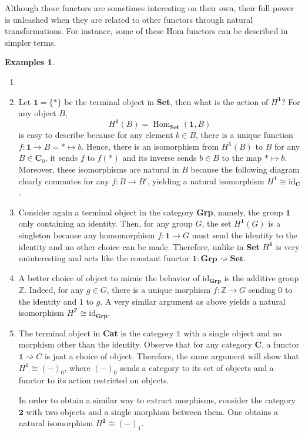 \documentclass{article}
\theoremstyle{definition}
\newtheorem{exmps}[thm]{Examples}
\theoremstyle{remark}
\newcommand{\Z}{\mathbb{Z}}
\newcommand{\one}{\mathbb{1}}
\DeclareMathOperator{\Hom}{Hom}
\newcommand{\id}{\text{id}}
\begin{document}
Although these functors are sometimes interesting on their own, their full power is unleashed when they are related to other functors through natural transformations. For instance, some of these Hom functors can be described in simpler terms.
\begin{exmps}
	\begin{enumerate}
		\item[]
		\item Let $\mathbf{1} = \{*\}$ be the terminal object in \textbf{Set}, then what is the action of $H^{\mathbf{1}}$? For any object $B$, \[H^{\mathbf{1}}(B) = \Hom_{\textbf{Set}}(\mathbf{1}, B)\]
		is easy to describe because for any element $b \in B$, there is a unique function $f: \mathbf{1} \rightarrow B = * \mapsto b$. Hence, there is an isomorphism from $H^{\mathbf{1}}(B)$ to $B$ for any $B \in \mathbf{C}_0$, it sends $f$ to $f(*)$ and its inverse sends $b\in B$ to the map $*\mapsto b$. Moreover, these isomorphisms are natural in $B$ because the following diagram clearly commutes for any $f:B\rightarrow B'$, yielding a natural isomorphism $H^{\mathbf{1}} \cong \id_{\mathbf{C}}$.
		\begin{figure}[h]
			\centering
		\end{figure}
		\item Consider again a terminal object in the category \textbf{Grp}, namely, the group $\mathbf{1}$ only containing an identity. Then, for any group $G$, the set $H^{\mathbf{1}}(G)$ is a singleton because any homomorphism $f:\mathbf{1}\rightarrow G$ must send the identity to the identity and no other choice can be made. Therefore, unlike in \textbf{Set} $H^{\mathbf{1}}$ is very uninteresting and acts like the constant functor $\mathbf{1}:\textbf{Grp} \rightsquigarrow \textbf{Set}$.
		
		\item A better choice of object to mimic the behavior of $\id_{\textbf{Grp}}$ is the additive group $\Z$. Indeed, for any $g\in G$, there is a unique morphism $f:\Z \rightarrow G$ sending $0$ to the identity and $1$ to $g$. A very similar argument as above yields a natural isomorphism $H^{\Z} \cong \id_{\textbf{Grp}}$.
		\item The terminal object in \textbf{Cat} is the category $\one$ with a single object and no morphism other than the identity. Observe that for any category $\mathbf{C}$, a functor $\one \rightsquigarrow C$ is just a choice of object. Therefore, the same argument will show that $H^{\one} \cong (-)_0$, where $(-)_0$ sends a category to its set of objects and a functor to its action restricted on objects.
		
	 	In order to obtain a similar way to extract morphisms, consider the category $\mathbf{2}$ with two objects and a single morphism between them. One obtains a natural isomorphism $H^{\mathbf{2}} \cong (-)_1$.
	\end{enumerate}
\end{exmps}
\end{document}
